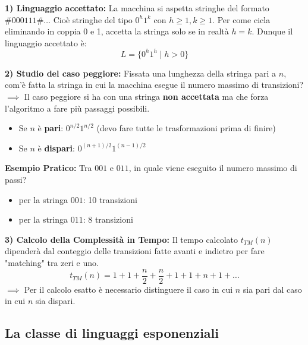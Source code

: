 \vspace{0.4cm}
\textbf{1) Linguaggio accettato:}
La macchina si aspetta stringhe del formato $\# 0 0 0 1 1 1 \# \dots$
Cioè stringhe del tipo $0^h 1^k$ con $h \ge 1, k \ge 1$. Per come cicla eliminando in coppia 0 e 1, accetta la stringa solo se in realtà $h=k$. Dunque il linguaggio accettato è:
$$ L = \{ 0^h 1^h \mid h > 0 \} $$

\vspace{0.4cm}
\textbf{2) Studio del caso peggiore:}
Fissata una lunghezza della stringa pari a $n$, com'è fatta la stringa in cui la macchina esegue il numero massimo di transizioni?
$\implies$ Il caso peggiore si ha con una stringa \textbf{non accettata} ma che forza l'algoritmo a fare più passaggi possibili.
\begin{itemize}
    \item Se $n$ è \textbf{pari}: $0^{n/2} 1^{n/2}$ (devo fare tutte le trasformazioni prima di finire)
    \item Se $n$ è \textbf{dispari}: $0^{(n+1)/2} 1^{(n-1)/2}$
\end{itemize}

\textbf{Esempio Pratico:} Tra $001$ e $011$, in quale viene eseguito il numero massimo di passi?
\begin{itemize}
    \item per la stringa $001$: 10 transizioni
    \item per la stringa $011$: 8 transizioni
\end{itemize}

\vspace{0.4cm}
\textbf{3) Calcolo della Complessità in Tempo:}
Il tempo calcolato $t_{TM}(n)$ dipenderà dal conteggio delle transizioni fatte avanti e indietro per fare "matching" tra zeri e uno.
$$ t_{TM}(n) = 1 + 1 + \frac{n}{2} + \frac{n}{2} + 1 + 1 + n + 1 + \dots $$
$\implies$ Per il calcolo esatto è necessario distinguere il caso in cui $n$ sia pari dal caso in cui $n$ sia dispari.















\subsection{La classe di linguaggi esponenziali}

